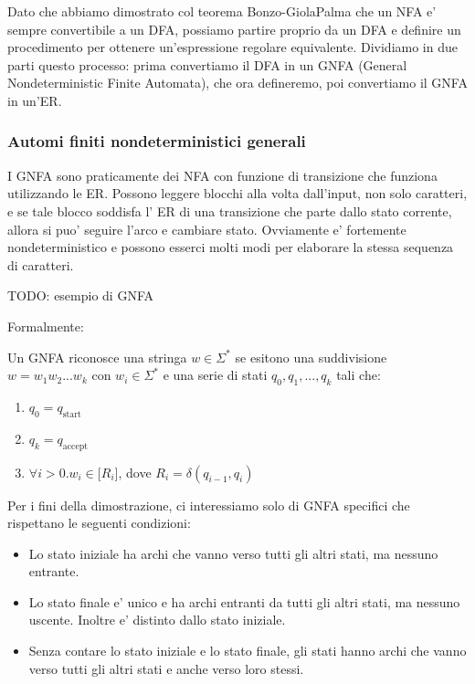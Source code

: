 Dato che abbiamo dimostrato col teorema Bonzo-GiolaPalma che un NFA e' sempre convertibile a un DFA, possiamo partire proprio da un DFA e definire un procedimento per ottenere un'espressione regolare equivalente. Dividiamo in due parti questo processo: prima convertiamo il DFA in un GNFA (General Nondeterministic Finite Automata), che ora defineremo, poi convertiamo il GNFA in un'ER.

\subsubsection{Automi finiti nondeterministici generali}
I GNFA sono praticamente dei NFA con funzione di transizione che funziona utilizzando le ER. Possono leggere blocchi alla volta dall'input, non solo caratteri, e se tale blocco soddisfa l' ER di una transizione che parte dallo stato corrente, allora si puo' seguire l'arco e cambiare stato. Ovviamente e' fortemente nondeterministico e possono esserci molti modi per elaborare la stessa sequenza di caratteri. 

TODO: esempio di GNFA

Formalmente:
 
Un GNFA riconosce una stringa $ w \in \Sigma^* $ se esitono una suddivisione $ w = w_1w_2...w_k $ con $ w_i \in \Sigma^* $ e una serie di stati $ q_0,q_1,...,q_k $ tali che:
\begin{enumerate}
  \item $ q_0 = q_{\text{start}} $
  \item $ q_k = q_{\text{accept}} $
  \item $ \forall i > 0. w_i \in \mathcal[R_i] $, dove $ R_i = \delta(q_{i-1}, q_i) $
\end{enumerate}


Per i fini della dimostrazione, ci interessiamo solo di GNFA specifici che rispettano le seguenti condizioni:
\begin{itemize}
  \item Lo stato iniziale ha archi che vanno verso tutti gli altri stati, ma nessuno entrante.
  \item Lo stato finale e' unico e ha archi entranti da tutti gli altri stati, ma nessuno uscente. Inoltre e' distinto dallo stato iniziale.
  \item Senza contare lo stato iniziale e lo stato finale, gli stati hanno archi che vanno verso tutti gli altri stati e anche verso loro stessi.
\end{itemize}

